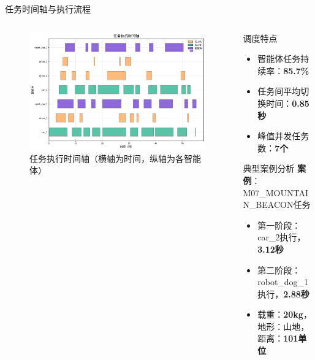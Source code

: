 \documentclass[
10pt,
aspectratio=169,
]{beamer}
\begin{document}
\begin{frame}{任务时间轴与执行流程}
    \begin{columns}
        \begin{column}{0.6\textwidth}
            \begin{figure}
                \centering
                \includegraphics[width=\textwidth]{analysis_results/task_timeline_20250617_081456.png}
                \caption{任务执行时间轴（横轴为时间，纵轴为各智能体）}
            \end{figure}
        \end{column}
        \begin{column}{0.4\textwidth}
            \begin{exampleblock}{调度特点}
                \begin{itemize}
                    \item 智能体任务持续率：\textbf{85.7\%}
                    \item 任务间平均切换时间：\textbf{0.85秒}
                    \item 峰值并发任务数：\textbf{7个}
                \end{itemize}
            \end{exampleblock}
            
            \begin{alertblock}{典型案例分析}
                \textbf{案例}：M07\_MOUNTAIN\_BEACON任务
                \begin{itemize}
                    \item 第一阶段：car\_2执行，\textbf{3.12秒}
                    \item 第二阶段：robot\_dog\_1执行，\textbf{2.88秒}
                    \item 载重：\textbf{20kg}，地形：山地，距离：\textbf{101单位}
                \end{itemize}
            \end{alertblock}
        \end{column}
    \end{columns}
\end{frame}
\end{document}
